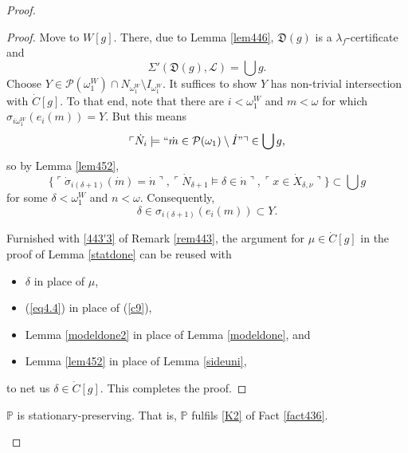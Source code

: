\documentclass[12pt]{article}
\numberwithin{equation}{section}
\begin{document}
\begin{proof}
\begin{proof}
Move to $W[g]$. There, due to Lemma \ref{lem446}, $\mathfrak{D}(g)$ is a $\lambda_f$-certificate and
\begin{equation*}
    \Sigma'(\mathfrak{D}(g), \mathcal{L}) = \bigcup g \text{.}
\end{equation*}
Choose $Y \in \mathcal{P}(\omega_1^W) \cap N_{\omega_1^W} \setminus I_{\omega_1^W}$. It suffices to show $Y$ has non-trivial intersection with $\dot{C}[g]$. To that end, note that there are $i < \omega_1^W$ and $m < \omega$ for which $\sigma_{i\omega_1^W}(e_i(m)) = Y$. But this means
\begin{equation*}
    \ulcorner \dot{N}_i \models ``\dot{m} \in \mathcal{P}(\omega_1) \setminus \dot{I}" \urcorner \in \bigcup g \text{,}
\end{equation*}
so by Lemma \ref{lem452}, 
\begin{equation*}
    \{\ulcorner \dot{\sigma}_{i(\delta + 1)}(\dot{m}) = \dot{n} \urcorner, \ulcorner \dot{N}_{\delta + 1} \models \delta \in \dot{n} \urcorner, \ulcorner x \in \dot{X}_{\delta, \nu} \urcorner\} \subset \bigcup g
\end{equation*}
for some $\delta < \omega_1^W$ and $n < \omega$. Consequently, 
\begin{equation*}
    \delta \in \sigma_{i(\delta + 1)}(e_i(m)) \subset Y \text{.}
\end{equation*}

Furnished with \ref{443'3} of Remark \ref{rem443}, the argument for $\mu \in \dot{C}[g]$ in the proof of Lemma \ref{statdone} can be reused with 
\begin{itemize}
    \item $\delta$ in place of $\mu$, 
    \item (\ref{eq4.4}) in place of (\ref{c9}),
    \item Lemma \ref{modeldone2} in place of Lemma \ref{modeldone}, and
    \item Lemma \ref{lem452} in place of Lemma \ref{sideuni},
\end{itemize}
to net us $\delta \in \dot{C}[g]$. This completes the proof.
\end{proof}

\begin{lem}\label{lem454}
$\mathbb{P}$ is stationary-preserving. That is, $\mathbb{P}$ fulfils \ref{K2} of Fact \ref{fact436}.
\end{lem}


\end{proof}
\end{document}
